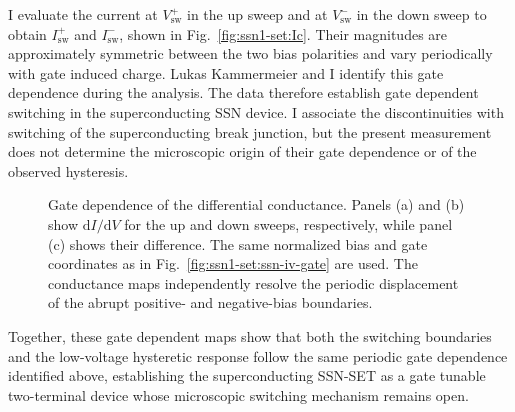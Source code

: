             I evaluate the current at $V_\mathrm{sw}^{+}$ in the up sweep and at $V_\mathrm{sw}^{-}$ in the down sweep to obtain $I_\mathrm{sw}^{+}$ and $I_\mathrm{sw}^{-}$, shown in Fig.~\ref{fig:ssn1-set:Ic}. Their magnitudes are approximately symmetric between the two bias polarities and vary periodically with gate induced charge. Lukas Kammermeier and I identify this gate dependence during the analysis. The data therefore establish gate dependent switching in the superconducting SSN device. I associate the discontinuities with switching of the superconducting break junction, but the present measurement does not determine the microscopic origin of their gate dependence or of the observed hysteresis.

            \begin{figure}[p]
                \centering
                \caption{
                    Gate dependence of the superconducting current recorded during voltage sweeps. Panels (a) and (b) show the current for the up and down sweeps, respectively, while panel (c) shows their difference. Each panel presents selected traces, a surface, and a false-color map. The low-voltage response and its abrupt boundaries vary periodically with the gate induced charge. Bias is normalized by $\Delta_0$, and current by $G_\mathrm{N}\Delta_0/e$.
                    }
                \label{fig:ssn1-set:ssn-iv-gate}
                \vspace{1em}
                \caption{
                    Gate dependence of the differential conductance. Panels (a) and (b) show $\mathrm{d}I/\mathrm{d}V$ for the up and down sweeps, respectively, while panel (c) shows their difference. The same normalized bias and gate coordinates as in Fig.~\ref{fig:ssn1-set:ssn-iv-gate} are used. The conductance maps independently resolve the periodic displacement of the abrupt positive- and negative-bias boundaries.
                    }
                \label{fig:ssn1-set:ssn-didv-gate}
            \end{figure}

            Together, these gate dependent maps show that both the switching boundaries and the low-voltage hysteretic response follow the same periodic gate dependence identified above, establishing the superconducting SSN-SET as a gate tunable two-terminal device whose microscopic switching mechanism remains open.
